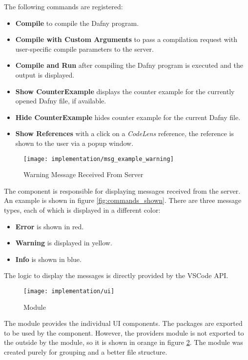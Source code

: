 The following commands are registered:
\begin{itemize}
    \item {\bf Compile} \textendash{} to compile the Dafny program.
    \item {\bf Compile with Custom Arguments} \textendash{} to pass a compilation request with user-specific
    compile parameters to the server.
    \item {\bf Compile and Run} \textendash{} after compiling the Dafny program is executed and the output is displayed.
    \item {\bf Show CounterExample} \textendash{} displays the counter example for the currently opened Dafny file, if available.
    \item {\bf Hide CounterExample} \textendash{} hides counter example for the current Dafny file.
    \item {\bf Show References} \textendash{} with a click on a \textit{CodeLens} reference,
    the reference is shown to the user via a popup window.
\end{itemize}

\begin{figure}[H]
    \centering
    \texttt{[image: implementation/msg\_example\_warning]}
    \caption{Warning Message Received From Server}
    \label{fig:msg_example}
\end{figure}

The  component is responsible for displaying messages received from the server.
An example is shown in figure \ref{fig:commands_shown}.
There are three message types, each of which is displayed in a different color:

\begin{itemize}
    \item {\bf Error} \textendash{} is shown in red.
    \item {\bf Warning} \textendash{} is displayed in yellow.
    \item {\bf Info} \textendash{} is shown in blue.
\end{itemize}

The logic to display the messages is directly provided by the VSCode API.

\begin{figure}[H]
    \centering
    \texttt{[image: implementation/ui]}
    \caption{Module }
    \label{fig:ui_module}
\end{figure}

The  module provides the individual UI components.
The packages are exported to be used by the  component.
However, the providers module is not exported to the outside by the  module,
so it is shown in orange in figure \ref{fig:ui_module}.
The module was created purely for grouping and a better file structure.\\

